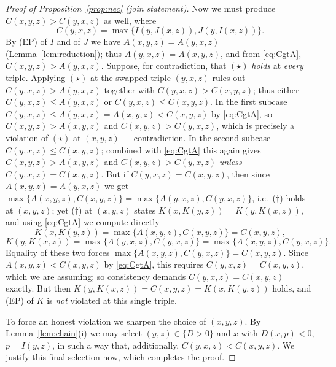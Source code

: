 \documentclass{amsart}
\theoremstyle{plain}
\theoremstyle{definition}
\begin{document}
\begin{proof}[Proof of Proposition~\ref{prop:nec} (join statement)]
Now we must produce $C(x,y,z)>C(y,x,z)$ as well, where
\[
C(y,x,z)=\max\{I(y,J(x,z)),J(y,I(x,z))\}.
\]
By (EP) of $I$ and of $J$ we have $A(x,y,z)=A(y,x,z)$ (Lemma~\ref{lem:reduction}); thus
$A(y,x,z)=A(x,y,z)$, and from \eqref{eq:CgtA}, $C(x,y,z)>A(y,x,z)$. Suppose, for
contradiction, that $(\star)$ \emph{holds} at \emph{every} triple. Applying $(\star)$ at
the swapped triple $(y,x,z)$ rules out $C(y,x,z)>A(y,x,z)$ together with
$C(y,x,z)>C(x,y,z)$; thus either $C(y,x,z)\le A(y,x,z)$ or $C(y,x,z)\le C(x,y,z)$. In the
first subcase $C(y,x,z)\le A(y,x,z)=A(x,y,z)<C(x,y,z)$ by \eqref{eq:CgtA}, so
$C(x,y,z)>A(x,y,z)$ and $C(x,y,z)>C(y,x,z)$, which is precisely a violation of $(\star)$ at
$(x,y,z)$ --- contradiction. In the second subcase $C(y,x,z)\le C(x,y,z)$; combined with
\eqref{eq:CgtA} this again gives $C(x,y,z)>A(x,y,z)$ and $C(x,y,z)>C(y,x,z)$ \emph{unless}
$C(y,x,z)=C(x,y,z)$. But if $C(y,x,z)=C(x,y,z)$, then since $A(x,y,z)=A(y,x,z)$ we get
$\max\{A(x,y,z),C(x,y,z)\}=\max\{A(y,x,z),C(y,x,z)\}$, i.e.\ ($\dagger$) holds at
$(x,y,z)$; yet ($\dagger$) at $(x,y,z)$ states
$K(x,K(y,z))=K(y,K(x,z))$, and using \eqref{eq:CgtA} we compute directly
\[
K(x,K(y,z))=\max\{A(x,y,z),C(x,y,z)\}=C(x,y,z),
\]
\[
K(y,K(x,z))=\max\{A(y,x,z),C(y,x,z)\}=\max\{A(x,y,z),C(y,x,z)\}.
\]
Equality of these two forces $\max\{A(x,y,z),C(y,x,z)\}=C(x,y,z)$. Since
$A(x,y,z)<C(x,y,z)$ by \eqref{eq:CgtA}, this requires $C(y,x,z)=C(x,y,z)$, which we are
assuming; so consistency demands $C(y,x,z)=C(x,y,z)$ exactly. But then $K(y,K(x,z))=
C(x,y,z)=K(x,K(y,z))$ holds, and (EP) of $K$ is \emph{not} violated at this single triple.

To force an honest violation we sharpen the choice of $(x,y,z)$. By
Lemma~\ref{lem:chain}(i) we may select $(y,z)\in\{D>0\}$ and $x$ with $D(x,p)<0$,
$p=I(y,z)$, in such a way that, additionally, $C(y,x,z)<C(x,y,z)$. We justify this final
selection now, which completes the proof.


\end{proof}
\end{document}
